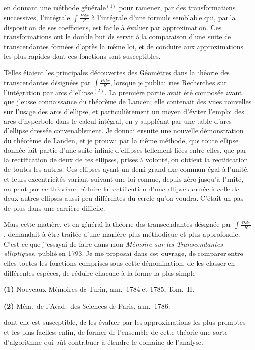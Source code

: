 \documentclass{article}
\begin{document}
en donnant une méthode générale${}^{(1)}$ pour ramener, par des transformations successives, l'intégrale $\displaystyle\int\frac{P\,dx}{R}$ à l'intégrale d'une formule semblable qui, par la disposition de ses coefficiens, est facile à évaluer par approximation. Ces transformations ont le double but de servir à la comparaison d'une suite de transcendantes formées d'après la même loi, et de conduire aux approximations les plus rapides dont ces fonctions sont susceptibles.

Telles étaient les principales découvertes des Géomètres dans la théorie des transcendantes désignées par $\displaystyle\int\frac{P\,dx}{R}$, lorsque je publiai mes Recherches sur l'intégration par arcs d'ellipse${}^{(2)}$. La première partie avait été composée avant que j'eusse connaissance du théorème de Landen; elle contenait des vues nouvelles sur l'usage des arcs d'ellipse, et particulièrement un moyen d'éviter l'emploi des arcs d'hyperbole dans le calcul intégral, en y suppléant par une table d'arcs d'ellipse dressée convenablement. Je donnai ensuite une nouvelle démonstration du théorème de Landen, et je prouvai par la même méthode, que toute ellipse donnée fait partie d'une suite infinie d'ellipses tellement liées entre elles, que par la rectification de deux de ces ellipses, prises à volonté, on obtient la rectification de toutes les autres. Ces ellipses ayant un demi-grand axe commun égal à l'unité, et leurs excentricités variant suivant une loi connue, depuis zéro jusqu'à l'unité, on peut par ce théorème réduire la rectification d'une ellipse donnée à celle de deux autres ellipses aussi peu différentes du cercle qu'on voudra. C'était un pas de plus dans une carrière difficile.

Mais cette matière, et en général la théorie des transcendantes désignée par $\displaystyle\int\frac{P\,dx}{R}$, demandait à être traitée d'une manière plus méthodique et plus approfondie. C'est ce que j'essayai de faire dans mon \emph{Mémoire sur les Transcendantes elliptiques}, publié en 1793. Je me proposai dans cet ouvrage, de comparer entre elles toutes les fonctions comprises sous cette dénomination, de les classer en différentes espèces, de réduire chacune à la forme la plus simple

\textbf{(1)} Nouveaux Mémoires de Turin, ann.\ 1784 et 1785, Tom.\ II.

\textbf{(2)} Mém.\ de l'Acad.\ des Sciences de Paris, ann.\ 1786.

dont elle est susceptible, de les évaluer par les approximations les plus promptes et les plus faciles; enfin, de former de l'ensemble de cette théorie une sorte d'algorithme qui pût contribuer à étendre le domaine de l'analyse.
\end{document}
